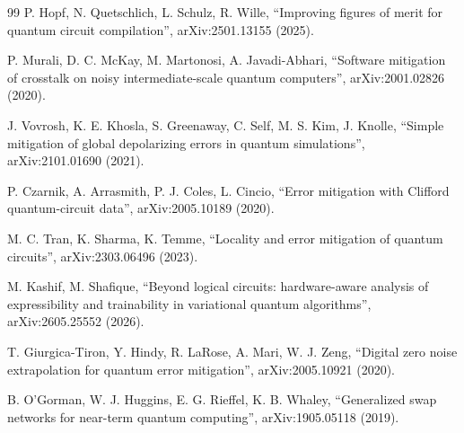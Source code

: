 \documentclass[11pt]{article}
\begin{document}
\begin{thebibliography}{99}
 P. Hopf, N. Quetschlich, L. Schulz, R. Wille, ``Improving figures of merit for quantum circuit
compilation'', arXiv:2501.13155 (2025).

 P. Murali, D. C. McKay, M. Martonosi, A. Javadi-Abhari, ``Software mitigation of crosstalk on noisy
intermediate-scale quantum computers'', arXiv:2001.02826 (2020).

 J. Vovrosh, K. E. Khosla, S. Greenaway, C. Self, M. S. Kim, J. Knolle, ``Simple mitigation of
global depolarizing errors in quantum simulations'', arXiv:2101.01690 (2021).

 P. Czarnik, A. Arrasmith, P. J. Coles, L. Cincio, ``Error mitigation with Clifford quantum-circuit
data'', arXiv:2005.10189 (2020).

 M. C. Tran, K. Sharma, K. Temme, ``Locality and error mitigation of quantum circuits'',
arXiv:2303.06496 (2023).

 M. Kashif, M. Shafique, ``Beyond logical circuits: hardware-aware analysis of expressibility and
trainability in variational quantum algorithms'', arXiv:2605.25552 (2026).

 T. Giurgica-Tiron, Y. Hindy, R. LaRose, A. Mari, W. J. Zeng, ``Digital zero noise extrapolation
for quantum error mitigation'', arXiv:2005.10921 (2020).

 B. O'Gorman, W. J. Huggins, E. G. Rieffel, K. B. Whaley, ``Generalized swap networks for
near-term quantum computing'', arXiv:1905.05118 (2019).

\end{thebibliography}
\end{document}
